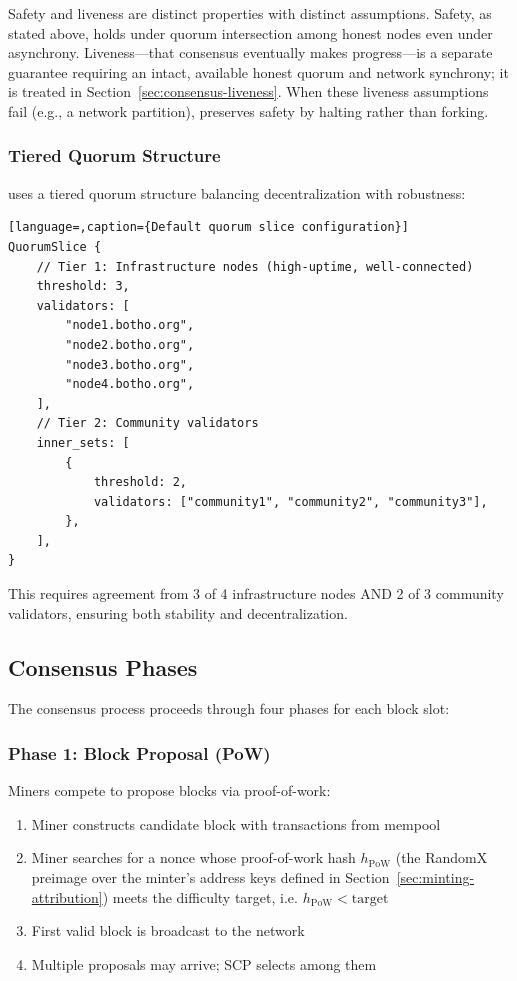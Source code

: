 Safety and liveness are distinct properties with distinct assumptions.
Safety, as stated above, holds under quorum intersection among honest nodes
even under asynchrony. Liveness---that consensus eventually makes
progress---is a separate guarantee requiring an intact, available honest
quorum and network synchrony; it is treated in
Section~\ref{sec:consensus-liveness}. When these liveness assumptions fail
(e.g., a network partition), \Botho preserves safety by halting rather than
forking.

\subsubsection{Tiered Quorum Structure}

\Botho uses a tiered quorum structure balancing decentralization with
robustness:

\begin{lstlisting}[language=,caption={Default quorum slice configuration}]
QuorumSlice {
    // Tier 1: Infrastructure nodes (high-uptime, well-connected)
    threshold: 3,
    validators: [
        "node1.botho.org",
        "node2.botho.org",
        "node3.botho.org",
        "node4.botho.org",
    ],
    // Tier 2: Community validators
    inner_sets: [
        {
            threshold: 2,
            validators: ["community1", "community2", "community3"],
        },
    ],
}
\end{lstlisting}

This requires agreement from 3 of 4 infrastructure nodes AND 2 of 3
community validators, ensuring both stability and decentralization.



\subsection{Consensus Phases}

The consensus process proceeds through four phases for each block slot:

\subsubsection{Phase 1: Block Proposal (PoW)}

Miners compete to propose blocks via proof-of-work:

\begin{enumerate}
  \item Miner constructs candidate block with transactions from mempool
  \item Miner searches for a nonce whose proof-of-work hash
    $h_{\text{PoW}}$ (the RandomX preimage over the minter's address keys
    defined in Section~\ref{sec:minting-attribution}) meets the
    difficulty target, i.e. $h_{\text{PoW}} < \text{target}$
  \item First valid block is broadcast to the network
  \item Multiple proposals may arrive; SCP selects among them
\end{enumerate}

